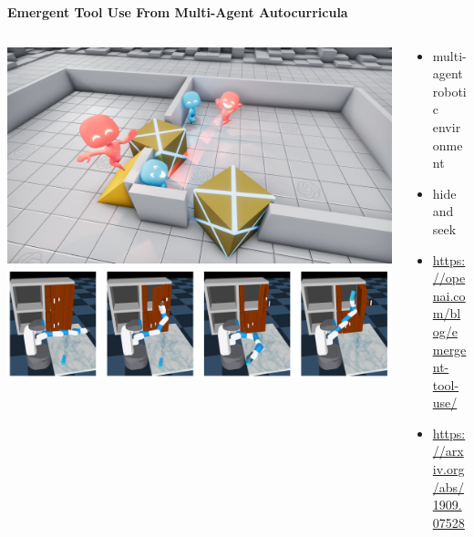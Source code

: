 \documentclass[xcolor=dvipsnames]{beamer}
\begin{document}
\begin{frame}{\bf Emergent Tool Use From Multi-Agent Autocurricula}


  \begin{columns}

      \begin{column}{0.5\textwidth}
        \includegraphics[scale=0.08]{../images/hide_and_seek.jpg}
        \includegraphics[scale=0.25]{../images/robot_doors.png}
      \end{column}

      \begin{column}{0.5\textwidth}
        \begin{itemize}
          \item multi-agent robotic environment
          \item hide and seek
          \item \url{https://openai.com/blog/emergent-tool-use/}
          \item \url{https://arxiv.org/abs/1909.07528}
        \end{itemize}
      \end{column}


  \end{columns} 

\end{frame}
\end{document}
